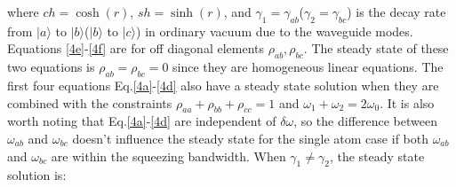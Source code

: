 \documentclass[aps,showpacs,twocolumn,twoside,groupedaddress]{revtex4}
\begin{document}
where $ch=\cosh(r)$, $sh=\sinh(r)$, and $\gamma_{1}=\gamma_{ab}$($\gamma_{2}=\gamma_{bc}$) is the decay rate from $|a\rangle$ to $|b\rangle$($|b\rangle$ to $|c\rangle$) in ordinary vacuum due to the waveguide modes. Equations \eqref{4e}-\eqref{4f} are for off diagonal elements $\rho_{ab}, \rho_{bc}$. The steady state of these two equations is $\rho_{ab}=\rho_{bc}=0$ since they are homogeneous linear equations. The first four equations Eq.\eqref{4a}-\eqref{4d} also have a steady state solution when they are combined with the constraints $\rho_{aa}+\rho_{bb}+\rho_{cc}=1$ and $\omega_1+\omega_2=2\omega_0$. It is also worth noting that Eq.\eqref{4a}-\eqref{4d} are independent of $\delta\omega$, so the difference between $\omega_{ab}$ and $\omega_{bc}$ doesn't influence the steady state for the single atom case if both $\omega_{ab}$ and $\omega_{bc}$ are within the squeezing bandwidth. When $\gamma_1\ne\gamma_2$, the steady state solution is:
\end{document}
